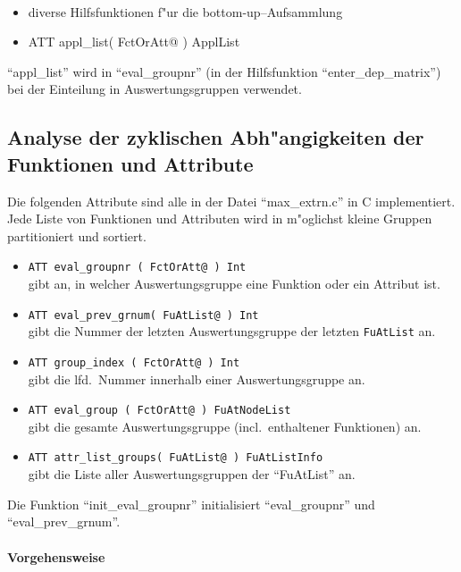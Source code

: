 {\tt
\begin{itemize}
\item {\rm diverse Hilfsfunktionen f"ur die bottom-up--Aufsammlung}
\item ATT appl\_list( FctOrAtt@ ) ApplList
\end{itemize}
}

"`appl\_list"' wird in "`eval\_groupnr"' (in der Hilfsfunktion "`enter\_dep\_matrix"')
bei der Einteilung in Auswertungsgruppen verwendet.


\subsection{Analyse der zyklischen Abh"angigkeiten der Funktionen und Attribute}

Die folgenden Attribute sind alle in der Datei "`max\_extrn.c"' in C implementiert.
Jede Liste von Funktionen und Attributen wird in m"oglichst kleine Gruppen
partitioniert und sortiert.

\begin{itemize}
\item {\tt ATT eval\_groupnr ( FctOrAtt@ ) Int}\\
gibt an, in welcher Auswertungsgruppe eine Funktion oder ein Attribut ist.
\item {\tt ATT eval\_prev\_grnum( FuAtList@ ) Int}\\
gibt die Nummer der letzten Auswertungsgruppe der letzten {\tt FuAtList} an.

\item {\tt ATT group\_index   ( FctOrAtt@ ) Int}\\
gibt die lfd.\ Nummer innerhalb einer Auswertungsgruppe an.

\item {\tt ATT eval\_group    ( FctOrAtt@ ) FuAtNodeList}\\
gibt die gesamte Auswertungsgruppe (incl.\ enthaltener Funktionen) an.

\item {\tt ATT attr\_list\_groups( FuAtList@ ) FuAtListInfo}\\
gibt die Liste aller Auswertungsgruppen der "`FuAtList"' an.

\end{itemize}

Die Funktion "`init\_eval\_groupnr"' initialisiert
"`eval\_groupnr"' und "`eval\_prev\_grnum"'.

\paragraph{Vorgehensweise}

